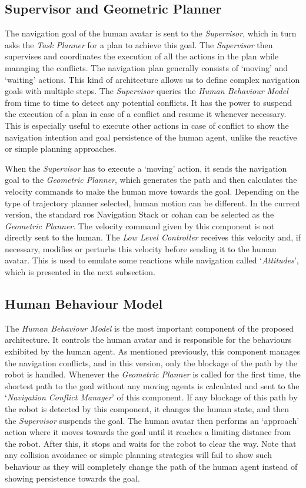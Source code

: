 \subsection{Supervisor and Geometric Planner}
The navigation goal of the human avatar is sent to the \textit{Supervisor}, which in turn asks the \textit{Task Planner} for a plan to achieve this goal. The \textit{Supervisor} then supervises and coordinates the execution of all the actions in the plan while managing the conflicts. The navigation plan generally consists of `moving' and `waiting' actions. This kind of architecture allows us to define complex navigation goals with multiple steps. The \textit{Supervisor} queries the \textit{Human Behaviour Model} from time to time to detect any potential conflicts. It has the power to suspend the execution of a plan in case of a conflict and resume it whenever necessary. This is especially useful to execute other actions in case of conflict to show the navigation intention and goal persistence of the human agent, unlike the reactive or simple planning approaches.

When the \textit{Supervisor} has to execute a `moving' action, it sends the navigation goal to the \textit{Geometric Planner}, which generates the path and then calculates the velocity commands to make the human move towards the goal. Depending on the type of trajectory planner selected, human motion can be different. In the current version, the standard \acrshort{ros} Navigation Stack or \acrshort{cohan} can be selected as the \textit{Geometric Planner}. The velocity command given by this component is not directly sent to the human. The \textit{Low Level Controller} receives this velocity and, if necessary, modifies or perturbs this velocity before sending it to the human avatar. This is used to emulate some reactions while navigation called `\textit{Attitudes}', which is presented in the next subsection.

\subsection{Human Behaviour Model}
The \textit{Human Behaviour Model} is the most important component of the proposed architecture. It controls the human avatar and is responsible for the behaviours exhibited by the human agent. As mentioned previously, this component manages the navigation conflicts, and in this version, only the blockage of the path by the robot is handled. Whenever the \textit{Geometric Planner} is called for the first time, the shortest path to the goal without any moving agents is calculated and sent to the `\textit{Navigation Conflict Manager}' of this component. If any blockage of this path by the robot is detected by this component, it changes the human state, and then the \textit{Supervisor} suspends the goal. The human avatar then performs an `approach' action where it moves towards the goal until it reaches a limiting distance from the robot. After this, it stops and waits for the robot to clear the way. Note that any collision avoidance or simple planning strategies will fail to show such behaviour as they will completely change the path of the human agent instead of showing persistence towards the goal.

